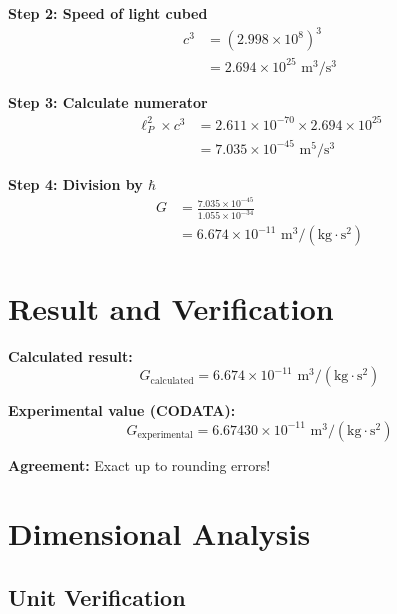 \documentclass[12pt,a4paper]{article}
\theoremstyle{definition}
\begin{document}
	\textbf{Step 2: Speed of light cubed}
	\begin{align}
		c^3 &= (2.998 \times 10^{8})^3 \\
		&= 2.694 \times 10^{25} \text{ m}^3/\text{s}^3
	\end{align}
	
	\textbf{Step 3: Calculate numerator}
	\begin{align}
		\ell_P^2 \times c^3 &= 2.611 \times 10^{-70} \times 2.694 \times 10^{25} \\
		&= 7.035 \times 10^{-45} \text{ m}^5/\text{s}^3
	\end{align}
	
	\textbf{Step 4: Division by $\hbar$}
	\begin{align}
		G &= \frac{7.035 \times 10^{-45}}{1.055 \times 10^{-34}} \\
		&= 6.674 \times 10^{-11} \text{ m}^3/(\text{kg} \cdot \text{s}^2)
	\end{align}
	
	\section{Result and Verification}
	
	\begin{result}
		\textbf{Calculated result:}
		\begin{equation}
			G_{\text{calculated}} = 6.674 \times 10^{-11} \text{ m}^3/(\text{kg} \cdot \text{s}^2)
		\end{equation}
		
		\textbf{Experimental value (CODATA):}
		\begin{equation}
			G_{\text{experimental}} = 6.67430 \times 10^{-11} \text{ m}^3/(\text{kg} \cdot \text{s}^2)
		\end{equation}
		
		\textbf{Agreement:} Exact up to rounding errors!
	\end{result}
	
	\section{Dimensional Analysis}
	
	\subsection{Unit Verification}
	
\end{document}
